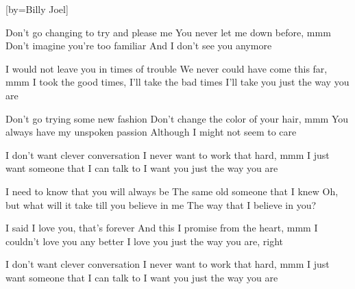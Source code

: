 [by={Billy Joel}]

  \chordsoff

  \beginverse
  Don't go changing to try and please me
  You never let me down before, mmm
  Don't imagine you're too familiar
  And I don't see you anymore
  \endverse

  \beginverse
  I would not leave you in times of trouble
  We never could have come this far, mmm
  I took the good times, I'll take the bad times
  I'll take you just the way you are
  \endverse

  \beginverse
  Don't go trying some new fashion
  Don't change the color of your hair, mmm
  You always have my unspoken passion
  Although I might not seem to care
  \endverse

  \beginverse
  I don't want clever conversation
  I never want to work that hard, mmm
  I just want someone that I can talk to
  I want you just the way you are
  \endverse

  \beginverse
  I need to know that you will always be
  The same old someone that I knew
  Oh, but what will it take till you believe in me
  The way that I believe in you?
  \endverse

  \beginverse
  I said I love you, that's forever
  And this I promise from the heart, mmm
  I couldn't love you any better
  I love you just the way you are, right
  \endverse

  \beginverse
  I don't want clever conversation
  I never want to work that hard, mmm
  I just want someone that I can talk to
  I want you just the way you are
  \endverse


\endsong

